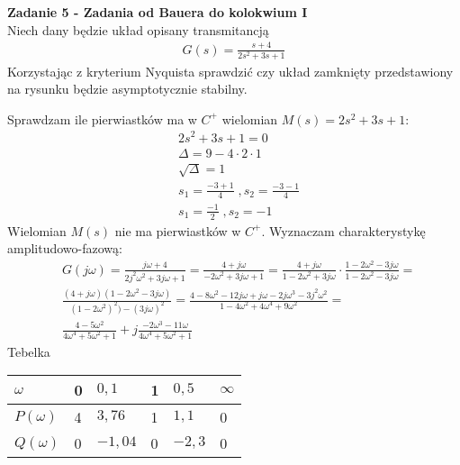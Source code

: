 \documentclass[a4paper,11pt]{article}
\begin{document}
\newpage
\begin{framed}
\textbf{Zadanie 5 - Zadania od Bauera do kolokwium I } \\ 
Niech dany będzie układ opisany transmitancją
\begin{align*}
G(s)=\frac{s+4}{2s^{2}+3s+1}
\end{align*}
Korzystając z kryterium Nyquista sprawdzić czy układ zamknięty przedstawiony na rysunku będzie asymptotycznie stabilny.
\begin{figure}[H]
\centering
{}
\label{fig:opt_par_1}
\end{figure}
\end{framed}
Sprawdzam ile pierwiastków ma w \( C^{+} \) wielomian \( M(s) = 2s^{2}+3s+1 \):
\begin{align*}
&2s^{2}+3s+1=0 \\
&\Delta = 9-4\cdot2\cdot1 \\
&\sqrt{\Delta}=1 \\
&s_{1}=\frac{-3+1}{4} \; , s_{2}=\frac{-3-1}{4} \\
&s_{1}=\frac{-1}{2} \; , s_{2}=-1
\end{align*}
Wielomian \( M(s) \) nie ma pierwiastków w \( C^{+} \). Wyznaczam charakterystykę amplitudowo-fazową:
\begin{align*}
&G(j \omega)=\frac{j\omega + 4}{2j^{2}\omega ^{2}+3j\omega + 1}= \frac{4+j\omega}{-2\omega ^{2}+3j\omega + 1}= \frac{4+j\omega}{1-2\omega ^{2}+3j\omega}\cdot\frac{1-2\omega ^{2}-3j\omega}{1-2\omega ^{2}-3j\omega} = \\
&\frac{(4+j\omega)(1-2\omega^{2}-3j\omega)}{(1-2\omega^{2})^{2})-(3j\omega ) ^{2}}= \frac{4-8\omega ^{2}-12j\omega+j\omega-2j\omega ^{3} - 3j^{2}\omega ^{2}}{1-4\omega ^{2}+4\omega^{4}+9\omega^{2}} = \\
&\frac{4-5\omega ^{2}}{4\omega ^{4}+5\omega^{2}+1}+j\frac{-2\omega^{3}-11\omega}{4\omega ^{4}+5\omega ^{2}+1}
\end{align*} 
Tebelka
\begin{table}[H]
\begin{center}
\begin{tabular}{|p{2cm}|p{2cm}|p{2cm}|p{2cm}|p{2cm}|p{2cm}|}
\hline
\( \omega \) & 0 & \( 0,1 \) & 1 & \( 0,5 \)& \( \infty\)  \\ \hline
\( P(\omega) \) & 4 & \(3,76 \) & 1 & \( 1,1 \) & 0  \\ \hline
\( Q(\omega) \) & 0 & \( -1,04 \) & 0 & \( -2,3 \) & 0  \\ \hline
\end{tabular}
\end{center}
\end{table}
\end{document}
